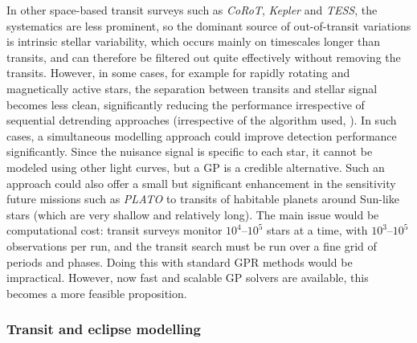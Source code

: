 \documentclass[letterpaper]{ar-1col}
\begin{document}
In other space-based transit surveys such as \textit{CoRoT}, \emph{Kepler} and \emph{TESS}, the systematics are less prominent, so the dominant source of out-of-transit variations is intrinsic stellar variability, which occurs mainly on timescales longer than transits, and can therefore be filtered out quite effectively without removing the transits. However, in some cases, for example for rapidly rotating and magnetically active stars, the separation between transits and stellar signal becomes less clean, significantly reducing the performance irrespective of sequential detrending approaches (irrespective of the algorithm used, \citealt{wotan}).
In such cases, a simultaneous modelling approach could improve detection performance significantly. Since the nuisance signal is specific to each star, it cannot be modeled using other light curves, but a GP is a credible alternative. Such an approach could also offer a small but significant enhancement in the sensitivity future missions such as \textit{PLATO} to transits of habitable planets around Sun-like stars (which are very shallow and relatively long). The main issue would be computational cost: transit surveys monitor $10^4$--$10^5$ stars at a time, with $10^3$--$10^5$ observations per run, and the transit search must be run over a fine grid of periods and phases. Doing this with standard GPR methods would be impractical. However, now fast and scalable GP solvers are available, this becomes a more feasible proposition.

\subsubsection{Transit and eclipse modelling}
\label{sec:transit_fit}
\end{document}
